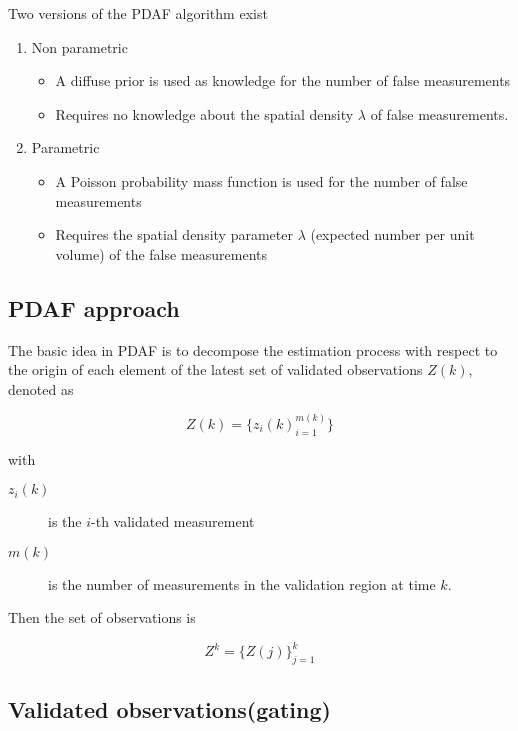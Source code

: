 Two versions of the PDAF algorithm exist

\begin{enumerate}
	\item Non parametric
	\begin{itemize}
	\item A diffuse prior is used as knowledge for the number of false measurements
	\item Requires no knowledge about the spatial density $\lambda$ of false measurements.
	\end{itemize}
	\item Parametric
	

	\begin{itemize}
		\item A Poisson probability mass function is used for the number of false measurements
		\item  Requires the spatial density parameter $\lambda$ (expected number per unit volume) of the false measurements
	\end{itemize}
\end{enumerate}

\subsection{PDAF approach}
The basic idea in PDAF is to decompose the estimation process with respect to the origin of each element of the latest set of validated observations $Z(k)$, denoted as

\begin{equation}\label{key}
Z(k) = \{z_i(k)^{m(k)}_{i=1}\}
\end{equation}

with

\begin{description}
	\item[$z_i(k)$] is the $i$-th validated measurement
	\item[$ m(k) $] is the number of measurements in the validation region at time $k$.
\end{description}

Then the set of observations is 

\begin{equation}\label{observSet}
	Z^k = \{Z(j)\}^{k}_{j=1}
\end{equation}


\subsection{Validated observations(gating)}

